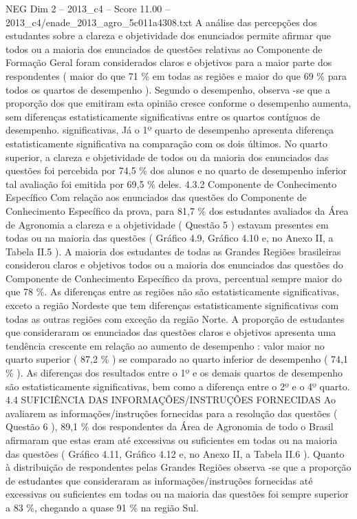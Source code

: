 \begin{textsample}{NEG Dim 2 – 2013\_c4 – Score 11.00 – 2013\_c4/enade\_2013\_agro\_5c011a4308.txt}
A análise das percepções dos estudantes sobre a clareza e objetividade dos enunciados permite afirmar que todos ou a maioria dos enunciados de questões relativas ao Componente de Formação Geral foram considerados claros e objetivos para a maior parte dos respondentes ( maior do que 71 \% em todas as regiões e maior do que 69 \% para todos os quartos de desempenho ).
Segundo o desempenho, observa -se que a proporção dos que emitiram esta opinião cresce conforme o desempenho aumenta, sem diferenças estatisticamente significativas entre os quartos contíguos de desempenho. significativas, Já o 1º quarto de desempenho apresenta diferença estatisticamente significativa na comparação com os dois últimos.
No quarto superior, a clareza e objetividade de todos ou da maioria dos enunciados das questões foi percebida por 74,5 \% dos alunos e no quarto de desempenho inferior tal avaliação foi emitida por 69,5 \% deles. 4.3.2 Componente de Conhecimento Específico Com relação aos enunciados das questões do Componente de Conhecimento Específico da prova, para 81,7 \% dos estudantes avaliados da Área de Agronomia a clareza e a objetividade ( Questão 5 ) estavam presentes em todas ou na maioria das questões ( Gráfico 4.9, Gráfico 4.10 e, no Anexo II, a Tabela II.5 ).
A maioria dos estudantes de todas as Grandes Regiões brasileiras considerou claros e objetivos todos ou a maioria dos enunciados das questões do Componente de Conhecimento Específico da prova, percentual sempre maior do que 78 \%.
As diferenças entre as regiões não são estatisticamente significativas, exceto a região Nordeste que tem diferenças estatisticamente significativas com todas as outras regiões com exceção da região Norte.
A proporção de estudantes que consideraram os enunciados das questões claros e objetivos apresenta uma tendência crescente em relação ao aumento de desempenho : valor maior no quarto superior ( 87,2 \% ) se comparado ao quarto inferior de desempenho ( 74,1 \% ).
As diferenças dos resultados entre o 1º e os demais quartos de desempenho são estatisticamente significativas, bem como a diferença entre o 2º e o 4º quarto. 4.4 SUFICIÊNCIA DAS INFORMAÇÕES/INSTRUÇÕES FORNECIDAS Ao avaliarem as informações/instruções fornecidas para a resolução das questões ( Questão 6 ), 89,1 \% dos respondentes da Área de Agronomia de todo o Brasil afirmaram que estas eram até excessivas ou suficientes em todas ou na maioria das questões ( Gráfico 4.11, Gráfico 4.12 e, no Anexo II, a Tabela II.6 ).
Quanto à distribuição de respondentes pelas Grandes Regiões observa -se que a proporção de estudantes que consideraram as informações/instruções fornecidas até excessivas ou suficientes em todas ou na maioria das questões foi sempre superior a 83 \%, chegando a quase 91 \% na região Sul.

\end{textsample}

